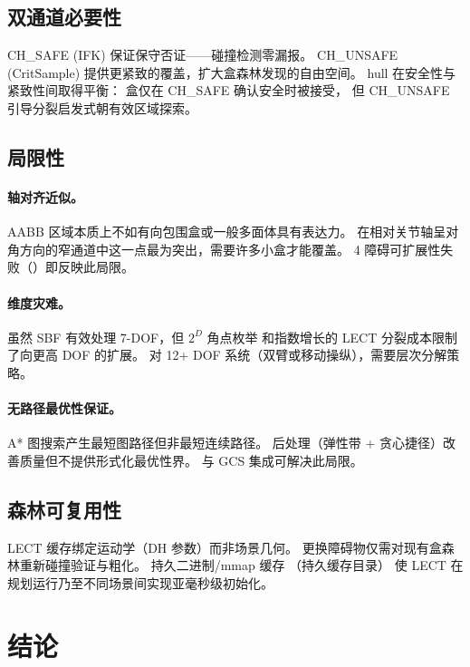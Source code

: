 \documentclass[journal]{IEEEtran}
\begin{document}
\subsection{双通道必要性}

CH\_SAFE (IFK) 保证保守否证——碰撞检测零漏报。
CH\_UNSAFE (CritSample) 提供更紧致的覆盖，扩大盒森林发现的自由空间。
hull 在安全性与紧致性间取得平衡：
盒仅在 CH\_SAFE 确认安全时被接受，
但 CH\_UNSAFE 引导分裂启发式朝有效区域探索。

\subsection{局限性}

\paragraph{轴对齐近似。}
AABB 区域本质上不如有向包围盒或一般多面体具有表达力。
在相对关节轴呈对角方向的窄通道中这一点最为突出，需要许多小盒才能覆盖。
4 障碍可扩展性失败（）即反映此局限。

\paragraph{维度灾难。}
虽然 SBF 有效处理 7-DOF，但 $2^D$ 角点枚举
和指数增长的 LECT 分裂成本限制了向更高 DOF 的扩展。
对 12+ DOF 系统（双臂或移动操纵），需要层次分解策略。

\paragraph{无路径最优性保证。}
A* 图搜索产生最短图路径但非最短连续路径。
后处理（弹性带 + 贪心捷径）改善质量但不提供形式化最优性界。
与 GCS 集成可解决此局限。

\subsection{森林可复用性}

LECT 缓存绑定运动学（DH 参数）而非场景几何。
更换障碍物仅需对现有盒森林重新碰撞验证与粗化。
持久二进制/mmap 缓存
（持久缓存目录）
使 LECT 在规划运行乃至不同场景间实现亚毫秒级初始化。

\section{结论}\label{sec:conclusion}
\end{document}
